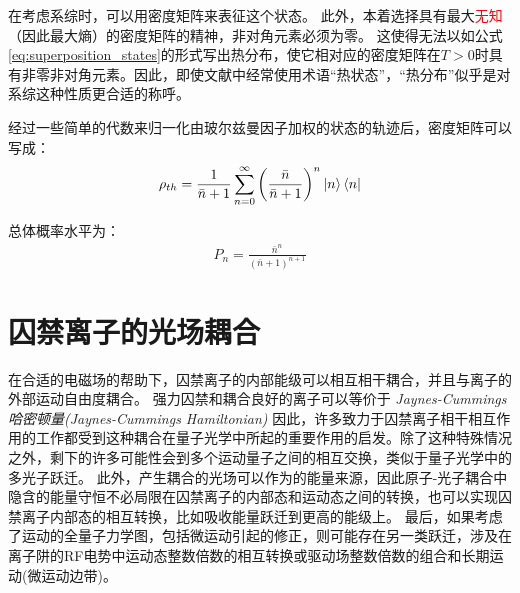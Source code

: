 在考虑系综时，可以用密度矩阵来表征这个状态。
此外，本着选择具有最大\textcolor{red}{无知}（因此最大熵）的密度矩阵的精神，非对角元素必须为零。
这使得无法以如公式\eqref{eq:superposition_states}的形式写出热分布，使它相对应的密度矩阵在$T>0$时具有非零非对角元素。因此，即使文献中经常使用术语“热状态”，“热分布”似乎是对系综这种性质更合适的称呼。

经过一些简单的代数来归一化由玻尔兹曼因子加权的状态的轨迹后，密度矩阵可以写成：
\begin{align}
    \rho_{th}=\frac{1}{\bar{n}+1}\sum_{n=0}^{\infty}\left(\frac{\bar{n}}{\bar{n}+1}\right)^n\ket{n}\bra{n}
\end{align}

总体概率水平为：
\begin{align}
    P_n=\frac{\bar{n}^n}{(\bar{n}+1)^{n+1}}
\end{align}







\section[囚禁离子的光场耦合]{囚禁离子的光场耦合}

在合适的电磁场的帮助下，囚禁离子的内部能级可以相互相干耦合，并且与离子的外部运动自由度耦合。
强力囚禁和耦合良好的离子可以等价于
\emph{Jaynes-Cummings 哈密顿量(Jaynes-Cummings Hamiltonian)}\cite[]{Janszky_Yushin_1986}
因此，许多致力于囚禁离子相干相互作用的工作都受到这种耦合在量子光学中所起的重要作用的启发。除了这种特殊情况之外，剩下的许多可能性会到多个运动量子之间的相互交换，类似于量子光学中的多光子跃迁。
此外，产生耦合的光场可以作为的能量来源，因此原子-光子耦合中隐含的能量守恒不必局限在囚禁离子的内部态和运动态之间的转换，也可以实现囚禁离子内部态的相互转换，比如吸收能量跃迁到更高的能级上。
最后，如果考虑了运动的全量子力学图，包括微运动引起的修正，则可能存在另一类跃迁，涉及在离子阱的RF电势中运动态整数倍数的相互转换或驱动场整数倍数的组合和长期运动(微运动边带)。

